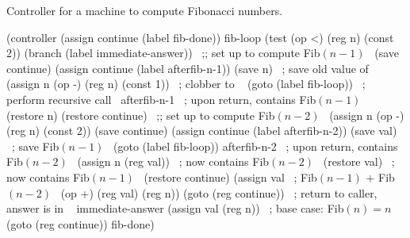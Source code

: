 \begin{codeFigure}{Controller for a machine to compute Fibonacci numbers.}
\begin{codeBlock}
(controller
   (assign continue (label fib-done))
 fib-loop
   (test (op <) (reg n) (const 2))
   (branch (label immediate-answer))
   ~\textrm{;; set up to compute Fib\( (n-1) \)}~
   (save continue)
   (assign continue (label afterfib-n-1))
   (save n)                 ~\textrm{; save old value of }~
   (assign n (op -) (reg n) (const 1)) ~\textrm{; clobber  to }~
   (goto (label fib-loop))  ~\textrm{; perform recursive call}~
 afterfib-n-1     ~\textrm{; upon return,  contains Fib\( (n-1) \)}~
   (restore n)
   (restore continue)
   ~\textrm{;; set up to compute Fib\( (n - 2) \)}~
   (assign n (op -) (reg n) (const 2))
   (save continue)
   (assign continue (label afterfib-n-2))
   (save val)               ~\textrm{; save Fib\( (n-1) \)}~
   (goto (label fib-loop))
 afterfib-n-2     ~\textrm{; upon return,  contains Fib\( (n-2) \)}~
   (assign n (reg val))     ~\textrm{;  now contains Fib\( (n-2) \)}~
   (restore val)            ~\textrm{;  now contains Fib\( (n-1) \)}~
   (restore continue)
   (assign val              ~\textrm{; Fib\( (n-1) \) + Fib\( (n-2) \)}~
           (op +) (reg val) (reg n))
   (goto (reg continue))    ~\textrm{; return to caller, answer is in }~
 immediate-answer
   (assign val (reg n))     ~\textrm{; base case: Fib\( (n) = n \)}~
   (goto (reg continue))
 fib-done)
\end{codeBlock}
\end{codeFigure}

